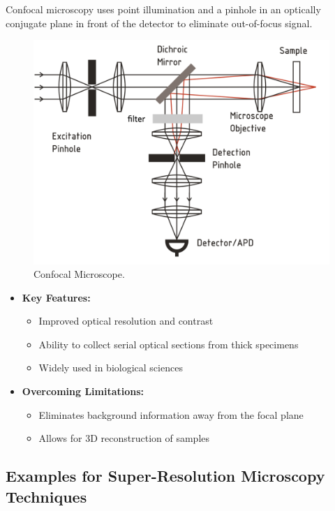 \documentclass[
  a4paper,
]{book}
\providecommand{\tightlist}{%
  \setlength{\itemsep}{0pt}\setlength{\parskip}{0pt}}
\begin{document}
\begin{tcolorbox}
Confocal microscopy uses point illumination and a pinhole in an
optically conjugate plane in front of the detector to eliminate
out-of-focus signal.

\begin{figure}[H]

{\centering \includegraphics[width=0.6\linewidth,height=\textheight,keepaspectratio]{geometrical-optics/img/confocal.png}

}

\caption{Confocal Microscope.}

\end{figure}%

\begin{itemize}
\tightlist
\item
  \textbf{Key Features:}

  \begin{itemize}
  \tightlist
  \item
    Improved optical resolution and contrast
  \item
    Ability to collect serial optical sections from thick specimens
  \item
    Widely used in biological sciences
  \end{itemize}
\item
  \textbf{Overcoming Limitations:}

  \begin{itemize}
  \tightlist
  \item
    Eliminates background information away from the focal plane
  \item
    Allows for 3D reconstruction of samples
  \end{itemize}
\end{itemize}

\subsection{Examples for Super-Resolution Microscopy
Techniques}\label{examples-for-super-resolution-microscopy-techniques}


\end{tcolorbox}
\end{document}
